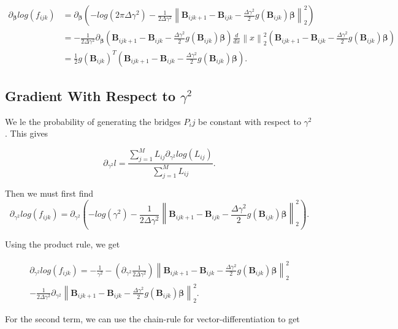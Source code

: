 \begin{equation} 
\begin{split}
\partial_{\bm \beta} log(f_{ijk}) & = \partial_{\bm \beta} (-log(2\pi \Delta \gamma^2) - \frac{1}{2\Delta \gamma^2} \left\lVert \textbf{B}_{ijk+1} - \textbf{B}_{ijk} - \frac{\Delta\gamma^2}{2} g(\textbf{B}_{ijk})\bm \beta \right\rVert_2^2) \\
& = -\frac{1}{2\Delta\gamma^2}\partial_{\bm \beta} (\textbf{B}_{ijk+1} - \textbf{B}_{ijk} - \frac{\Delta\gamma^2}{2} g(\textbf{B}_{ijk})\bm \beta) \frac{d}{dx} \left\lVert x \right\rVert_2^2(\textbf{B}_{ijk+1} - \textbf{B}_{ijk} - \frac{\Delta\gamma^2}{2} g(\textbf{B}_{ijk})\bm \beta) \\
& = \frac{1}{2} g(\textbf{B}_{ijk})^T(\textbf{B}_{ijk+1} - \textbf{B}_{ijk} - \frac{\Delta\gamma^2}{2} g(\textbf{B}_{ijk})\bm \beta).
\end{split}
\end{equation}




\subsection{Gradient With Respect to $\gamma^2$}
We le the probability of generating the bridges $P_ij$ be constant with respect to $\gamma^2$. This gives

$$
\partial_{\gamma^2}l = \frac{\sum_{j=1}^ML_{ij}\partial_{\gamma^2} log(L_{ij})}{\sum_{j=1}^ML_{ij}}.
$$

Then we must first find
$$
\partial_{\gamma^2} log(f_{ijk}) = \partial_{\gamma^2} (-log(\gamma^2) - \frac{1}{2\Delta\gamma^2}\left\lVert \textbf{B}_{ijk+1} - \textbf{B}_{ijk} - \frac{\Delta\gamma^2}{2} g(\textbf{B}_{ijk})\bm \beta \right\rVert_2^2).
$$

Using the product rule, we get

\begin{align*}
\partial_{\gamma^2} log(f_{ijk})  = -\frac{1}{\gamma^2} -(\partial_{\gamma^2} \frac{1}{2\Delta \gamma^2})\left\lVert \textbf{B}_{ijk+1} - \textbf{B}_{ijk} - \frac{\Delta\gamma^2}{2} g(\textbf{B}_{ijk})\bm \beta \right\rVert_2^2 \\ -  \frac{1}{2\Delta \gamma^2} \partial_{\gamma^2} \left\lVert \textbf{B}_{ijk+1} - \textbf{B}_{ijk} - \frac{\Delta\gamma^2}{2} g(\textbf{B}_{ijk})\bm \beta \right\rVert_2^2.
\end{align*}

For the second term, we can use the chain-rule for vector-differentiation to get

